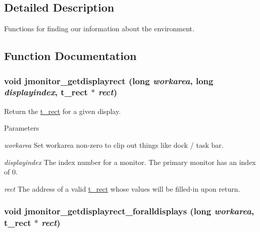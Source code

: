 \subsection{Detailed Description}
Functions for finding our information about the environment. 

\subsection{Function Documentation}
\hypertarget{group__jmonitor_gac11ee33880f15ef641236e864978d9af}{
\subsubsection[{jmonitor\_\-getdisplayrect}]{\setlength{\rightskip}{0pt plus 5cm}void jmonitor\_\-getdisplayrect (long {\em workarea}, \/  long {\em displayindex}, \/  {\bf t\_\-rect} $\ast$ {\em rect})}}
\label{group__jmonitor_gac11ee33880f15ef641236e864978d9af}


Return the \hyperlink{structt__rect}{t\_\-rect} for a given display. 
\begin{DoxyParams}{Parameters}
\item[{\em workarea}]Set workarea non-\/zero to clip out things like dock / task bar. \item[{\em displayindex}]The index number for a monitor. The primary monitor has an index of 0. \item[{\em rect}]The address of a valid \hyperlink{structt__rect}{t\_\-rect} whose values will be filled-\/in upon return. \end{DoxyParams}
\hypertarget{group__jmonitor_ga0ed7c2c443ef010c4584096967f3b00f}{
\subsubsection[{jmonitor\_\-getdisplayrect\_\-foralldisplays}]{\setlength{\rightskip}{0pt plus 5cm}void jmonitor\_\-getdisplayrect\_\-foralldisplays (long {\em workarea}, \/  {\bf t\_\-rect} $\ast$ {\em rect})}}
\label{group__jmonitor_ga0ed7c2c443ef010c4584096967f3b00f}


